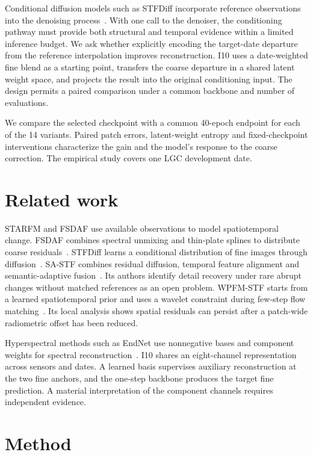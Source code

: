\documentclass[a4paper,10pt,twocolumn]{article}
\begin{document}
Conditional diffusion models such as STFDiff incorporate reference observations into the denoising process~\citep{huang2024stfdiff}. With one call to the denoiser, the conditioning pathway must provide both structural and temporal evidence within a limited inference budget. We ask whether explicitly encoding the target-date departure from the reference interpolation improves reconstruction. I10 uses a date-weighted fine blend as a starting point, transfers the coarse departure in a shared latent weight space, and projects the result into the original conditioning input. The design permits a paired comparison under a common backbone and number of evaluations.

We compare the selected checkpoint with a common 40-epoch endpoint for each of the 14 variants. Paired patch errors, latent-weight entropy and fixed-checkpoint interventions characterize the gain and the model's response to the coarse correction. The empirical study covers one LGC development date.

\section{Related work}
STARFM and FSDAF use available observations to model spatiotemporal change. FSDAF combines spectral unmixing and thin-plate splines to distribute coarse residuals~\citep{gao2006starfm,zhu2016fsdaf}. STFDiff learns a conditional distribution of fine images through diffusion~\citep{huang2024stfdiff}. SA-STF combines residual diffusion, temporal feature alignment and semantic-adaptive fusion~\citep{zhang2026sastf}. Its authors identify detail recovery under rare abrupt changes without matched references as an open problem. WPFM-STF starts from a learned spatiotemporal prior and uses a wavelet constraint during few-step flow matching~\citep{hu2026wpfm}. Its local analysis shows spatial residuals can persist after a patch-wide radiometric offset has been reduced.

Hyperspectral methods such as EndNet use nonnegative bases and component weights for spectral reconstruction~\citep{ozkan2019endnet}. I10 shares an eight-channel representation across sensors and dates. A learned basis supervises auxiliary reconstruction at the two fine anchors, and the one-step backbone produces the target fine prediction. A material interpretation of the component channels requires independent evidence.

\section{Method}
\end{document}
